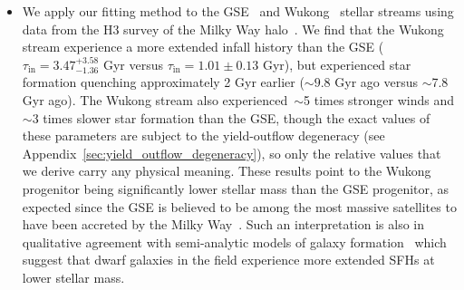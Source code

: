 \documentclass[ms.tex]{subfiles}
\begin{document}
\begin{itemize}

	\item We apply our fitting method to the GSE~\citep{Belokurov2018,
	Helmi2018} and Wukong~\citep{Naidu2020, Naidu2022} stellar streams using
	data from the H3 survey of the Milky Way halo~\citep{Conroy2019}.
	We find that the Wukong stream experience a more extended infall history
	than the GSE ($\tau_\text{in} = 3.47^{+3.58}_{-1.36}$ Gyr versus
	$\tau_\text{in} = 1.01 \pm 0.13$ Gyr), but experienced star formation
	quenching approximately 2 Gyr earlier ($\sim9.8$ Gyr ago versus
	$\sim$7.8 Gyr ago).
	The Wukong stream also experienced~$\sim$5 times stronger winds and
	$\sim$3 times slower star formation than the GSE, though the exact values
	of these parameters are subject to the yield-outflow degeneracy (see
	Appendix~\ref{sec:yield_outflow_degeneracy}), so only the relative values
	that we derive carry any physical meaning.
	These results point to the Wukong progenitor being significantly lower
	stellar mass than the GSE progenitor, as expected since the GSE is believed
	to be among the most massive satellites to have been accreted by the Milky
	Way~\citep{Myeong2018, Deason2019, Fattahi2019, Mackereth2019,
	Vincenzo2019}.
	Such an interpretation is also in qualitative agreement with semi-analytic
	models of galaxy formation~\citep[e.g.][]{Baugh2005, Baugh2006, Bower2006,
	Benson2012, Somerville2015a, Somerville2015b, Croton2016, Behroozi2019}
	which suggest that dwarf galaxies in the field experience more extended
	SFHs at lower stellar mass.


\end{itemize}
\end{document}
